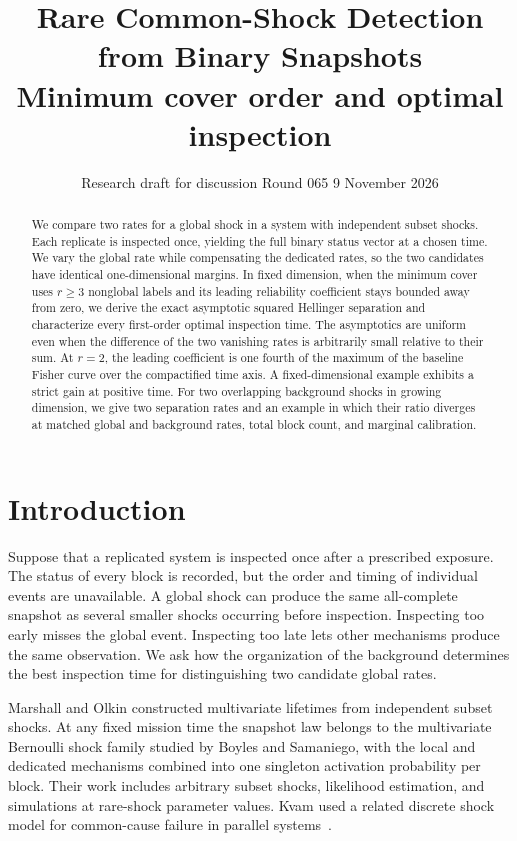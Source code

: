 \documentclass[11pt]{article}
\title{Rare Common-Shock Detection from Binary Snapshots\\[3pt]
  \large Minimum cover order and optimal inspection}
\author{}
\date{Research draft for discussion \textbullet{} Round 065 \textbullet{} 9 November 2026}
\begin{document}
\maketitle
\begin{abstract}
We compare two rates for a global shock in a system with independent subset shocks. Each replicate is inspected once, yielding the full binary status vector at a chosen time. We vary the global rate while compensating the dedicated rates, so the two candidates have identical one-dimensional margins. In fixed dimension, when the minimum cover uses \(r\ge3\) nonglobal labels and its leading reliability coefficient stays bounded away from zero, we derive the exact asymptotic squared Hellinger separation and characterize every first-order optimal inspection time. The asymptotics are uniform even when the difference of the two vanishing rates is arbitrarily small relative to their sum. At \(r=2\), the leading coefficient is one fourth of the maximum of the baseline Fisher curve over the compactified time axis. A fixed-dimensional example exhibits a strict gain at positive time. For two overlapping background shocks in growing dimension, we give two separation rates and an example in which their ratio diverges at matched global and background rates, total block count, and marginal calibration.
\end{abstract}

\section{Introduction}\label{introduction}

Suppose that a replicated system is inspected once after a prescribed exposure. The status of every block is recorded, but the order and timing of individual events are unavailable. A global shock can produce the same all-complete snapshot as several smaller shocks occurring before inspection. Inspecting too early misses the global event. Inspecting too late lets other mechanisms produce the same observation. We ask how the organization of the background determines the best inspection time for distinguishing two candidate global rates.

Marshall and Olkin constructed multivariate lifetimes from independent subset shocks. At any fixed mission time the snapshot law belongs to the multivariate Bernoulli shock family studied by Boyles and Samaniego, with the local and dedicated mechanisms combined into one singleton activation probability per block. Their work includes arbitrary subset shocks, likelihood estimation, and simulations at rare-shock parameter values. Kvam used a related discrete shock model for common-cause failure in parallel systems~\cite{marshall1967,boyles1983,boyles1984,kvam1996}.
\end{document}
